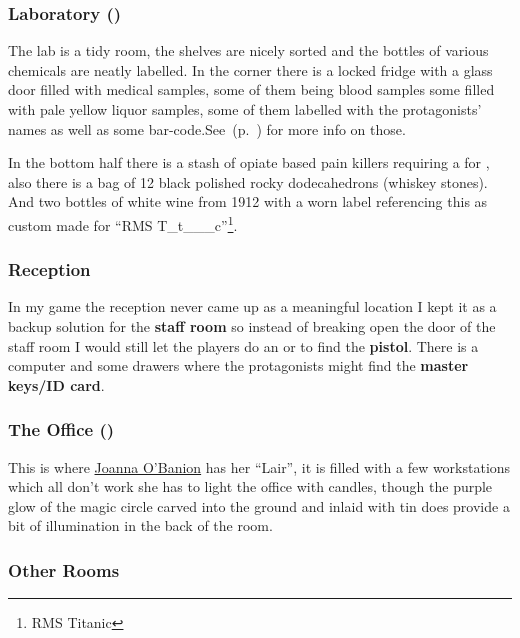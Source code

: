 \documentclass[bg-full]{resources/stylesheets/kult}
\begin{document}
\subsubsection{Laboratory (\faLock)}%
\label{ssub:laboratory}

The lab is a tidy room, the shelves are nicely sorted and the bottles of various chemicals are neatly labelled.  In the corner there
is a locked fridge with a glass door filled with medical samples, some of them being blood samples some filled with pale yellow liquor
samples, some of them labelled with the protagonists' names as well as some bar-code.See~(p.~\pageref{ssub:vials}) for more info on those.

In the bottom half there is a stash of opiate based pain killers requiring a  for , also
there is a bag of 12 black polished rocky dodecahedrons (whiskey stones).  And two bottles of white wine from 1912 with a worn label
referencing this as custom made for “RMS T\_t\_\_\_c”\footnote{RMS Titanic}.

\subsubsection{Reception}%
\label{ssub:reception}

In my game the reception never came up as a meaningful location I kept it as a backup solution for the \textbf{staff room} so
instead of breaking open the door of the staff room I would still let the players do an 
or  to find the \textbf{pistol}.  There is a computer and some drawers where the protagonists might
find the \textbf{master keys/ID card}.

\subsubsection{The Office (\faLock)}%
\label{ssub:the_office}

This is where \hyperref[ssub:joanna_o_banion]{Joanna O'Banion} has her “Lair”, it is filled with a few workstations which all
don't work she has to light the office with candles, though the purple glow of the magic circle carved into the ground and
inlaid with tin does provide a bit of illumination in the back of the room.


\subsubsection{Other Rooms}%
\label{ssub:other_rooms}
\end{document}
